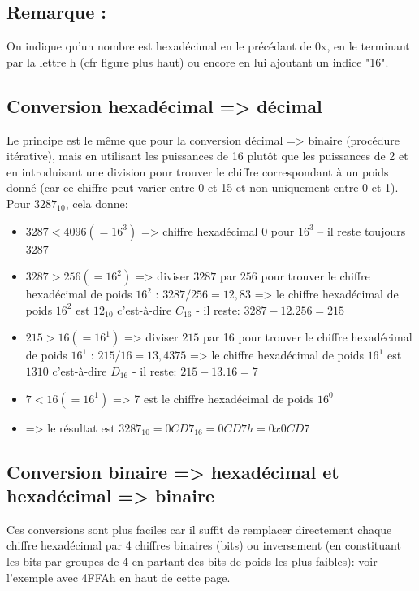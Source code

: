 \subsection{Remarque :}
On indique qu’un nombre est hexadécimal en le précédant de 0x, en le terminant par la lettre h (cfr figure plus haut) ou encore en lui ajoutant un indice "16".


\subsection{Conversion hexadécimal => décimal}
Le principe est le même que pour la conversion décimal => binaire (procédure itérative), mais en utilisant les puissances de 16 plutôt que les puissances de 2 et en introduisant une division pour trouver le chiffre correspondant à un poids donné (car ce chiffre peut varier entre 0 et 15 et non uniquement entre 0 et 1).\\

Pour $3287_{10}$, cela donne:
\vspace{2mm}
\begin{itemize}
\item $3287 < 4096 (= 16^3)$ => chiffre hexadécimal $0$ pour $16^3$ – il reste toujours $3287$
\item $3287 > 256 (= 16^2)$ => diviser $3287$ par $256$ pour trouver le chiffre hexadécimal de poids $16^2$ : $3287/256=12,83$ => le chiffre hexadécimal de poids $16^2$ est $12_{10}$ c'est-à-dire $C_{16}$ - il reste: $3287-12.256 = 215$
\item $215 > 16 (= 16^1)$ => diviser $215$ par 16 pour trouver le chiffre hexadécimal de poids $16^1$ : $215/16=13,4375$ => le chiffre hexadécimal de poids $16^1$ est $1310$ c'est-à-dire $D_{16}$ - il reste: $215-13.16 = 7$
\item $7 < 16 (= 16^1)$ => 7 est le chiffre hexadécimal de poids $16^0$
\item => le résultat est $3287_{10} = 0CD7_{16} = 0CD7h = 0x0CD7$
\end{itemize}

\subsection{Conversion binaire => hexadécimal et hexadécimal => binaire}
Ces conversions sont plus faciles car il suffit de remplacer directement chaque chiffre hexadécimal par 4 chiffres binaires (bits) ou inversement (en constituant les bits par groupes de 4 en partant des bits de poids les plus faibles): voir l'exemple avec 4FFAh en haut de cette page.


